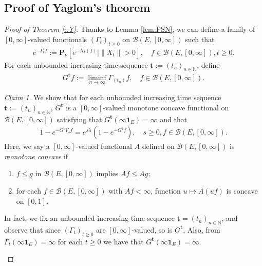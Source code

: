 \documentclass[12pt,a4paper]{amsart}
\numberwithin{equation}{section}
\theoremstyle{plain}
\theoremstyle{definition}
\theoremstyle{remark}
\newtheorem{claim}[thm]{Claim}
\newenvironment{proof*}[1][\proofname]{
  \renewcommand\qedsymbol{$\blacksquare$}
  \begin{proof}[#1]}{\end{proof}}
\begin{document}
\subsection{Proof of Yaglom's theorem}
\label{sec:MY}
\begin{proof}[Proof of Theorem \ref{::Y}]

Thanks to Lemma \ref{lem:PSN}, we can define a family of $[0,\infty]$-valued functionals $(\Gamma_t)_{t\geq 0}$ on $\mathcal B(E, [0,\infty])$ such that
\begin{align}
  e^{-\Gamma_t f}
  := \mathbf P_{\nu}[e^{- X_t(f)}| \|X_t\| > 0], 
  \quad f\in \mathcal B(E,[0,\infty]), t \geq 0.
\end{align}
For each unbounded increasing time sequence $\mathbf t:= (t_n)_{n\in \mathbb N}$, define
\begin{align}
  G^{\mathbf t}f 
  := \liminf_{n\to \infty} \Gamma_{(t_n)}f,
  \quad f\in \mathcal B(E, [0,\infty]).
\end{align}

\begin{claim}\label{::YGt}
We show that for each unbounded increasing time sequence $\mathbf t:= (t_n)_{n\in \mathbb N}$, $G^{\mathbf t}$ is a $[0,\infty]$-valued monotone concave functional on $\mathcal B(E,[0,\infty])$ satisfying that $G^{\mathbf t}(\infty \mathbf 1_E) = \infty$ and that
\begin{align}
  \label{eq:MY1}
  1 - e^{- G^{\mathbf t}V_sf} 
  = e^{s\lambda} (1- e^{- G^{\mathbf t} f}),
  \quad s \geq 0, f \in \mathcal B(E, [0,\infty]).
\end{align}
Here, we say a $[0,\infty]$-valued functional $A$ defined on $\mathcal B(E,[0,\infty])$ is \emph{monotone concave} if 
\begin{enumerate}
\item
  $f\leq g$ in $\mathcal B(E,[0,\infty])$ implies $Af\leq Ag$;
\item
  for each $f\in \mathcal B(E,[0,\infty])$ with $Af<\infty$, function $u\mapsto A(uf)$ is concave on $[0, 1]$.  
\end{enumerate}
\end{claim}

\begin{proof*}
In fact, we fix an unbounded increasing time sequence $\mathbf t = (t_n)_{n\in \mathbb N}$, and observe that since $(\Gamma_t)_{t\geq 0}$ are $[0,\infty]$-valued, so is $G^{\mathbf t}$. 
Also, from $\Gamma_t(\infty \mathbf 1_E) = \infty$ for each $t\geq 0$ we have that $G^{\mathbf t}(\infty \mathbf 1_E) = \infty$.


\end{proof*}
\end{proof}
\end{document}
